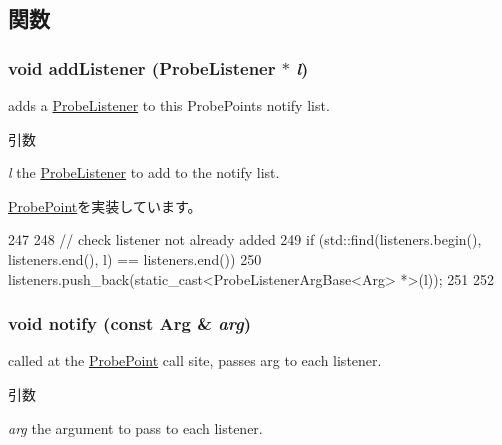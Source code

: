 \subsection{関数}
\hypertarget{classProbePointArg_ac282f544c73aa50eaed3d43845d122d3}{
\subsubsection[{addListener}]{\setlength{\rightskip}{0pt plus 5cm}void addListener ({\bf ProbeListener} $\ast$ {\em l})}}
\label{classProbePointArg_ac282f544c73aa50eaed3d43845d122d3}


adds a \hyperlink{classProbeListener}{ProbeListener} to this ProbePoints notify list. 
\begin{DoxyParams}{引数}
\item[{\em l}]the \hyperlink{classProbeListener}{ProbeListener} to add to the notify list. \end{DoxyParams}


\hyperlink{classProbePoint_a6faaaab14f1e331042dbc6a84d74854b}{ProbePoint}を実装しています。


\begin{DoxyCode}
247     {
248         // check listener not already added
249         if (std::find(listeners.begin(), listeners.end(), l) == listeners.end()) 
      {
250             listeners.push_back(static_cast<ProbeListenerArgBase<Arg> *>(l));
251         }
252     }
\end{DoxyCode}
\hypertarget{classProbePointArg_a558191a8c66a37ace08feb713c5d4931}{
\subsubsection[{notify}]{\setlength{\rightskip}{0pt plus 5cm}void notify (const Arg \& {\em arg})}}
\label{classProbePointArg_a558191a8c66a37ace08feb713c5d4931}


called at the \hyperlink{classProbePoint}{ProbePoint} call site, passes arg to each listener. 
\begin{DoxyParams}{引数}
\item[{\em arg}]the argument to pass to each listener. \end{DoxyParams}



